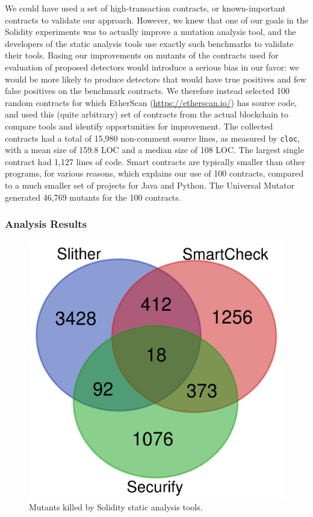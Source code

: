 We could have used a set of high-transaction contracts, or known-important contracts to validate our approach.  However, we knew that one of our goals in the Solidity experiments was to actually improve a mutation analysis tool, and the developers of the static analysis tools use exactly such benchmarks to validate their tools.  Basing our improvements on mutants of the contracts used for evaluation of proposed detectors would introduce a serious bias in our favor: we would be more likely to produce detectors that would have true positives and few false positives on the benchmark contracts.  We therefore instead selected 100 random contracts for which EtherScan (\url{https://etherscan.io/}) has source code, and used this (quite arbitrary) set of contracts from the actual blockchain to compare tools and identify opportunities for improvement.  The collected contracts had a total of 15,980 non-comment source lines, as measured by {\tt cloc}, with a mean size of 159.8 LOC and a median size of 108 LOC.  The largest single contract had 1,127 lines of code.  Smart contracts are typically smaller than other programs, for various reasons, which explains our use of 100 contracts, compared to a much smaller set of projects for Java and Python.  The Universal Mutator generated 46,769 mutants for the 100 contracts.

\subsubsection{Analysis Results}

\begin{figure}
  \includegraphics[width=\columnwidth]{solidity.png}
  \caption{Mutants killed by Solidity static analysis tools.}
  \label{fig:solidityvenn}
\end{figure}

